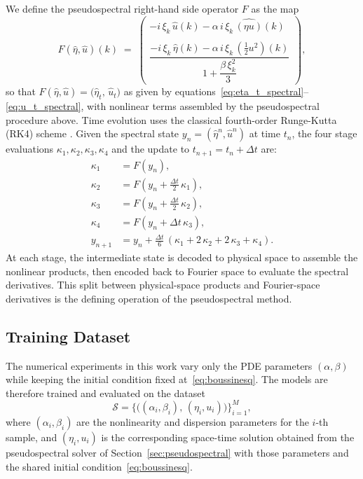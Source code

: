 We define the pseudospectral right-hand side operator $F$ as the map
\begin{equation}\label{eq:rhs_F}
    F\!\left(\hat{\eta},\hat{u}\right)(k)
    \;=\;
    \begin{pmatrix}
        -i\,\xi_k\,\hat{u}(k)
        - \alpha\,i\,\xi_k\,\widehat{(\eta u)}(k) \\[6pt]
        \dfrac{
            -i\,\xi_k\,\hat{\eta}(k)
            - \alpha\,i\,\xi_k\,\widehat{\!\left(\tfrac{1}{2}u^2\right)}\!(k)
        }{
            1 + \dfrac{\beta\,\xi_k^2}{3}
        }
    \end{pmatrix},
\end{equation}
so that $F(\hat{\eta},\hat{u}) = \bigl(\hat{\eta}_t,\, \hat{u}_t\bigr)$ as given by equations~\eqref{eq:eta_t_spectral}--\eqref{eq:u_t_spectral}, with nonlinear terms assembled by the pseudospectral procedure above. Time evolution uses the classical fourth-order Runge-Kutta (RK4) scheme \parencite{suli2003, burden2011}. Given the spectral state $y_n = (\hat{\eta}^n, \hat{u}^n)$ at time $t_n$, the four stage evaluations $\kappa_1, \kappa_2, \kappa_3, \kappa_4$ and the update to $t_{n+1} = t_n + \Delta t$ are:
\begin{align}
    \kappa_1 &= F(y_n), \nonumber \\
    \kappa_2 &= F\!\left(y_n + \tfrac{\Delta t}{2}\, \kappa_1\right), \nonumber \\
    \kappa_3 &= F\!\left(y_n + \tfrac{\Delta t}{2}\, \kappa_2\right), \nonumber \\
    \kappa_4 &= F\!\left(y_n + \Delta t\, \kappa_3\right), \nonumber \\
    y_{n+1}  &= y_n + \frac{\Delta t}{6}\,(\kappa_1 + 2\,\kappa_2 + 2\,\kappa_3 + \kappa_4).
    \label{eq:rk4}
\end{align}
At each stage, the intermediate state is decoded to physical space to assemble the nonlinear products, then encoded back to Fourier space to evaluate the spectral derivatives. This split between physical-space products and Fourier-space derivatives is the defining operation of the pseudospectral method.

\subsection{Training Dataset}
\label{sec:dataset}

The numerical experiments in this work vary only the PDE parameters $(\alpha,\beta)$ while keeping the initial condition fixed at~\eqref{eq:boussinesq}. The models are therefore trained and evaluated on the dataset
\begin{equation}\label{eq:dataset}
    \mathcal{S} = \bigl\{\bigl((\alpha_i,\beta_i),\,(\eta_i,u_i)\bigr)\bigr\}_{i=1}^{M},
\end{equation}
where $(\alpha_i,\beta_i)$ are the nonlinearity and dispersion parameters for the $i$-th sample, and $(\eta_i,u_i)$ is the corresponding space-time solution obtained from the pseudospectral solver of Section~\ref{sec:pseudospectral} with those parameters and the shared initial condition~\eqref{eq:boussinesq}.

